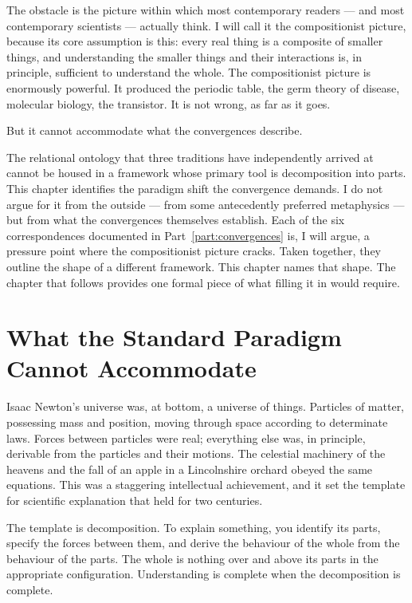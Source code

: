 The obstacle is the picture within which most contemporary readers --- and most
contemporary scientists --- actually think. I will call it the compositionist
picture, because its core assumption is this: every real thing is a composite
of smaller things, and understanding the smaller things and their interactions
is, in principle, sufficient to understand the whole. The compositionist picture
is enormously powerful. It produced the periodic table, the germ theory of
disease, molecular biology, the transistor. It is not wrong, as far as it goes.

But it cannot accommodate what the convergences describe.

The relational ontology that three traditions have independently arrived at
cannot be housed in a framework whose primary tool is decomposition into parts.
This chapter identifies the paradigm shift the convergence demands. I do not
argue for it from the outside --- from some antecedently preferred
metaphysics --- but from what the convergences themselves establish. Each of the
six correspondences documented in Part~\ref{part:convergences} is, I will
argue, a pressure point where the compositionist picture cracks. Taken
together, they outline the shape of a different framework. This chapter names
that shape. The chapter that follows provides one formal piece of what filling
it in would require.


\section{What the Standard Paradigm Cannot Accommodate}
\label{sec:standard-paradigm}

Isaac Newton's universe was, at bottom, a universe of things. Particles of
matter, possessing mass and position, moving through space according to
determinate laws. Forces between particles were real; everything else was, in
principle, derivable from the particles and their motions. The celestial
machinery of the heavens and the fall of an apple in a Lincolnshire orchard obeyed
the same equations. This was a staggering intellectual achievement, and it set
the template for scientific explanation that held for two centuries.

The template is decomposition. To explain something, you identify its parts,
specify the forces between them, and derive the behaviour of the whole from the
behaviour of the parts. The whole is nothing over and above its parts in the
appropriate configuration. Understanding is complete when the decomposition is
complete.

